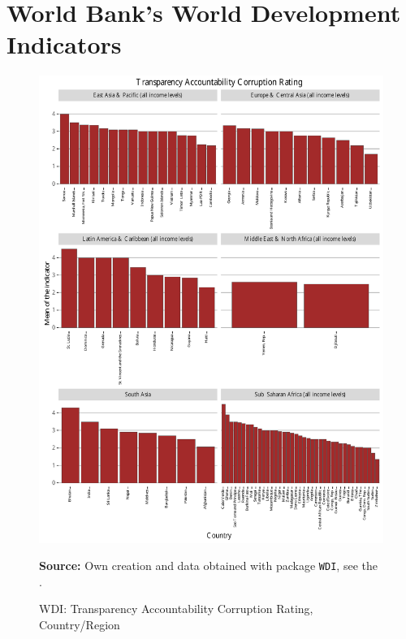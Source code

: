 \section{World Bank's World Development Indicators} \label{sec_wdi}
\begin{figure}[H]
\begin{center}
\caption{WDI: Transparency Accountability Corruption Rating, Country/Region}
\label{fig_wdi_transp}
\includegraphics[max height=.82\textheight]{../img/wdi_transparency_accountability_corruption_rating.pdf}
\end{center}
\noindent \footnotesize{\textbf{Source:} Own creation and data obtained with package \texttt{WDI}, see the \cite{wb_r}.}
\end{figure}

